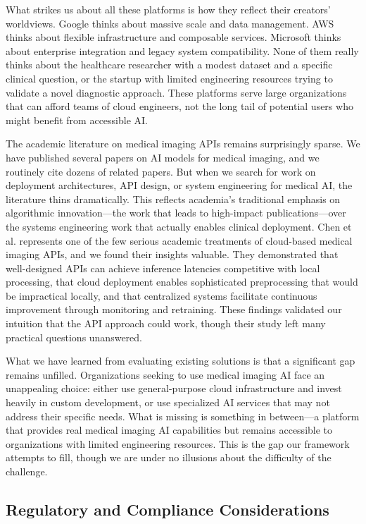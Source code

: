 \documentclass[12pt,a4paper]{article}
\begin{document}
What strikes us about all these platforms is how they reflect their creators' worldviews. Google thinks about massive scale and data management. AWS thinks about flexible infrastructure and composable services. Microsoft thinks about enterprise integration and legacy system compatibility. None of them really thinks about the healthcare researcher with a modest dataset and a specific clinical question, or the startup with limited engineering resources trying to validate a novel diagnostic approach. These platforms serve large organizations that can afford teams of cloud engineers, not the long tail of potential users who might benefit from accessible AI.

The academic literature on medical imaging APIs remains surprisingly sparse. We have published several papers on AI models for medical imaging, and we routinely cite dozens of related papers. But when we search for work on deployment architectures, API design, or system engineering for medical AI, the literature thins dramatically. This reflects academia's traditional emphasis on algorithmic innovation—the work that leads to high-impact publications—over the systems engineering work that actually enables clinical deployment. Chen et al. \cite{chen2021lowdose} represents one of the few serious academic treatments of cloud-based medical imaging APIs, and we found their insights valuable. They demonstrated that well-designed APIs can achieve inference latencies competitive with local processing, that cloud deployment enables sophisticated preprocessing that would be impractical locally, and that centralized systems facilitate continuous improvement through monitoring and retraining. These findings validated our intuition that the API approach could work, though their study left many practical questions unanswered.

What we have learned from evaluating existing solutions is that a significant gap remains unfilled. Organizations seeking to use medical imaging AI face an unappealing choice: either use general-purpose cloud infrastructure and invest heavily in custom development, or use specialized AI services that may not address their specific needs. What is missing is something in between—a platform that provides real medical imaging AI capabilities but remains accessible to organizations with limited engineering resources. This is the gap our framework attempts to fill, though we are under no illusions about the difficulty of the challenge.

\subsection{Regulatory and Compliance Considerations}
\end{document}
